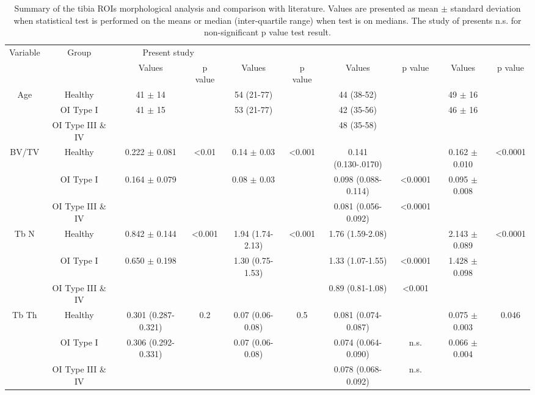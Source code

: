 \documentclass[a4paper,fleqn]{DC_ArtStyle}
\begin{document}
\begin{sidewaystable*}
	\centering
	\caption{Summary of the tibia ROIs morphological analysis and comparison with literature. Values are presented as mean $\pm$ standard deviation when statistical test is performed on the means or median (inter-quartile range) when test is on medians. The study of \cite{Kocijan2015} presents n.s. for non-significant p value test result.}
	\label{Table2}
	\begin{tabular}{cccccccccc}
		\toprule
		\multirow{2}{*}{Variable} & \multirow{2}{*}{Group} & \multicolumn{2}{c}{Present study} & \multicolumn{2}{c}{\citeauthor{Folkestad2012}\cite{Folkestad2012}} & \multicolumn{2}{c}{\citeauthor{Kocijan2015}\cite{Kocijan2015}} & \multicolumn{2}{c}{\citeauthor{Rolvien2018}\cite{Rolvien2018}} \\
		& & Values & p value & Values & p value & Values & p value & Values & p value \\
		\midrule
		
		\multirow{3}{*}{Age} & Healthy & 41 $\pm$ 14 &  & 54 (21-77) & & 44 (38-52) &  & 49 $\pm$ 16 &  \\
		& OI Type I & \multirow{2}{*}{41 $\pm$ 15} &  & 53 (21-77) &  & 42 (35-56) & & \multirow{2}{*}{46 $\pm$ 16} & \\
		&  OI Type III \& IV & &  &  &  & 48 (35-58) & & & \\[3ex]
		
		\multirow{3}{*}{BV/TV} & Healthy & 0.222 $\pm$ 0.081 & <0.01 & 0.14 $\pm$ 0.03 & <0.001 & 0.141 (0.130-.0170) & & 0.162 $\pm$ 0.010 & <0.0001 \\
		& OI Type I & \multirow{2}{*}{0.164 $\pm$ 0.079} &  & 0.08 $\pm$ 0.03 &  & 0.098 (0.088-0.114) & <0.0001 & \multirow{2}{*}{0.095 $\pm$ 0.008} & \\
		&  OI Type III \& IV & & & & & 0.081 (0.056-0.092) & <0.0001 & & \\[3ex]
		
		\multirow{3}{*}{Tb N} & Healthy & 0.842 $\pm$ 0.144 & <0.001 & 1.94 (1.74-2.13) & <0.001 & 1.76 (1.59-2.08) & & 2.143 $\pm$ 0.089 & <0.0001 \\
		& OI Type I & \multirow{2}{*}{0.650 $\pm$ 0.198} &  & 1.30 (0.75-1.53) &  & 1.33 (1.07-1.55) & <0.0001 & \multirow{2}{*}{1.428 $\pm$ 0.098} & \\
		&  OI Type III \& IV & & & & & 0.89 (0.81-1.08) & <0.001 & & \\[3ex]
		
		\multirow{3}{*}{Tb Th} & Healthy & 0.301 (0.287-0.321) & 0.2 & 0.07 (0.06-0.08) & 0.5 & 0.081 (0.074-0.087) & & 0.075 $\pm$ 0.003 & 0.046 \\
		& OI Type I & \multirow{2}{*}{0.306 (0.292-0.331)} &  & 0.07 (0.06-0.08) &  & 0.074 (0.064-0.090) & n.s. & \multirow{2}{*}{0.066 $\pm$ 0.004} & \\
		&  OI Type III \& IV & & & & & 0.078 (0.068-0.092) & n.s. & & \\[3ex]
		

\end{tabular}
\end{sidewaystable*}
\end{document}
